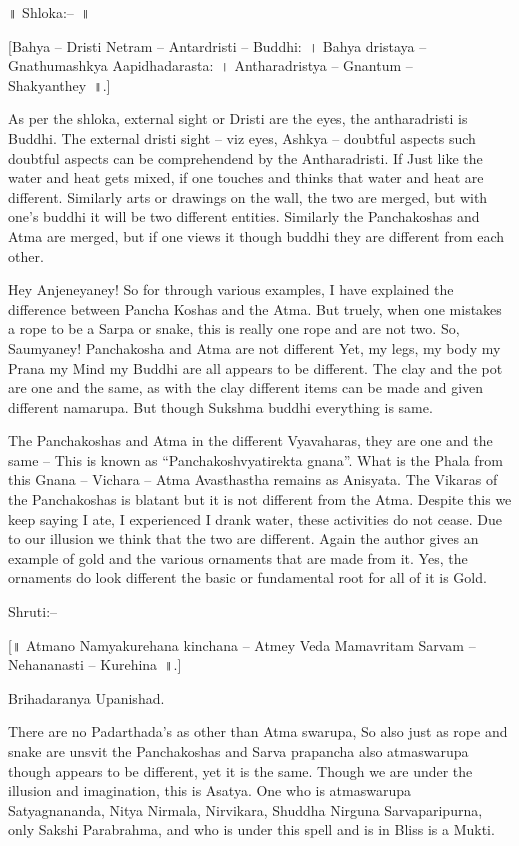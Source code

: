 ॥ Shloka:–~॥

 [Bahya – Dristi Netram – Antardristi – Buddhi:~। 
 Bahya dristaya – Gnathumashkya Aapidhadarasta:~। 
 Antharadristya – Gnantum – Shakyanthey~॥.]

As per the shloka, external sight or Dristi are the eyes, the antharadristi is Buddhi. The external dristi sight – viz eyes, Ashkya – doubtful aspects such doubtful aspects can be comprehendend by the Antharadristi. If Just like the water and heat gets mixed, if one touches and thinks that water and heat are different. Similarly arts or drawings on the wall, the two are merged, but with one's buddhi it will be two different entities. Similarly the Panchakoshas and Atma are merged, but if one views it though buddhi they are different from each other.

Hey Anjeneyaney! So for through various examples, I have explained the difference between Pancha Koshas and the Atma. But truely, when one mistakes a rope to be a Sarpa or snake, this is really one rope and are not two. So, Saumyaney! Panchakosha and Atma are not different Yet, my legs, my body my Prana my Mind my Buddhi are all appears to be different. The clay and the pot are one and the same, as with the clay different items can be made and given different namarupa. But though Sukshma buddhi everything is same.

The Panchakoshas and Atma in the different Vyavaharas, they are one and the same – This is known as “Panchakoshvyatirekta gnana”. What is the Phala from this Gnana – Vichara – Atma Avasthastha remains as Anisyata. The Vikaras of the Panchakoshas is blatant but it is not different from the Atma. Despite this we keep saying I ate, I experienced I drank water, these activities do not cease. Due to our illusion we think that the two are different. Again the author gives an example of gold and the various ornaments that are made from it. Yes, the ornaments do look different the basic or fundamental root for all of it is Gold.

Shruti:–

[॥ Atmano Namyakurehana kinchana – Atmey Veda Mamavritam Sarvam – Nehananasti – Kurehina~॥.]

Brihadaranya Upanishad.

There are no Padarthada's as other than Atma swarupa, So also just as rope and snake are unsvit the Panchakoshas and Sarva prapancha also atmaswarupa though appears to be different, yet it is the same. Though we are under the illusion and imagination, this is Asatya. One who is atmaswarupa Satyagnananda, Nitya Nirmala, Nirvikara, Shuddha Nirguna Sarvaparipurna, only Sakshi Parabrahma, and who is under this spell and is in Bliss is a Mukti.

